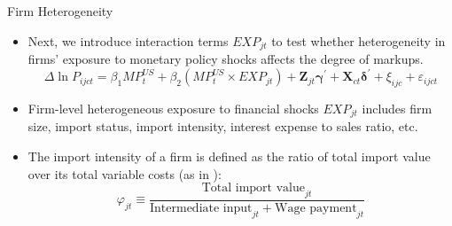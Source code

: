 \documentclass[10pt]{beamer}
\begin{document}
\begin{frame}{Firm Heterogeneity}
    \begin{itemize}
        \item Next, we introduce interaction terms $EXP_{jt}$ to test whether heterogeneity in firms' exposure to monetary policy shocks affects the degree of markups.
        \begin{equation}
    	\Delta \ln P_{i j c t}=\beta_1 M P_{t}^{US} + \beta_2 (M P_{t}^{US} \times EXP_{jt})+ \mathbf{Z}_{jt} \boldsymbol{\gamma}^{\prime}+\mathbf{X}_{ct} \boldsymbol{\delta}^{\prime} +\xi_{i j c} + \varepsilon_{ijct}
    	\label{eq.exposure}
        \end{equation}
        \item Firm-level heterogeneous exposure to financial shocks $EXP_{jt}$ includes firm size, import status, import intensity, interest expense to sales ratio, etc.
        \item The import intensity of a firm is defined as the ratio of total import value over its total variable costs (as in \cite{aik2014}):
        $$\varphi_{jt} \equiv \frac{\text{Total import value}_{jt}}{\text{Intermediate input}_{jt}+\text{Wage payment}_{jt}}$$
    \end{itemize}
\end{frame}
\end{document}
